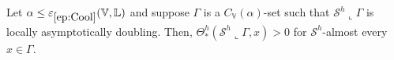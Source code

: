 \documentclass[10pt, a4paper,
oneside, headinclude,footinclude]{scrartcl}
\begin{document}


\begin{proposizione}\label{prop:DensitaInfPositiva}
Let $\alpha\leq\oldep{ep:Cool}(\mathbb V,\mathbb L)$ and suppose $\Gamma$ is a $C_\mathbb{V}(\alpha)$-set such that $\mathcal{S}^h\llcorner \Gamma$ is locally asymptotically doubling. Then, $\Theta^h_*(\mathcal{S}^h\llcorner\Gamma,x)>0$ for $\mathcal{S}^h$-almost every $x\in\Gamma$.
\end{proposizione}
\end{document}
